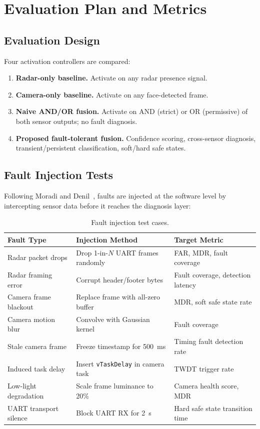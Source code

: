 \documentclass[12pt]{extarticle}
\begin{document}
\section{Evaluation Plan and Metrics}
\label{sec:eval}

\subsection{Evaluation Design}

Four activation controllers are compared:
\begin{enumerate}
  \item \textbf{Radar-only baseline.} Activate on any radar presence signal.
  \item \textbf{Camera-only baseline.} Activate on any face-detected frame.
  \item \textbf{Naive AND/OR fusion.} Activate on AND (strict) or OR (permissive)
        of both sensor outputs; no fault diagnosis.
  \item \textbf{Proposed fault-tolerant fusion.} Confidence scoring, cross-sensor
        diagnosis, transient/persistent classification, soft/hard safe states.
\end{enumerate}

\subsection{Fault Injection Tests}

Following Moradi and Denil~\cite{moradi2020faultinj}, faults are injected at the
software level by intercepting sensor data before it reaches the diagnosis layer:

\begin{table}[H]
\centering
\caption{Fault injection test cases.}
\label{tab:faultinj}
\small
\begin{tabular}{p{3.5cm}p{4.5cm}p{4.5cm}}
\toprule
\textbf{Fault Type} & \textbf{Injection Method} & \textbf{Target Metric}\\
\midrule
Radar packet drops     & Drop 1-in-$N$ UART frames randomly & FAR, MDR, fault coverage\\
Radar framing error    & Corrupt header/footer bytes & Fault coverage, detection latency\\
Camera frame blackout  & Replace frame with all-zero buffer & MDR, soft safe state rate\\
Camera motion blur     & Convolve with Gaussian kernel & Fault coverage\\
Stale camera frame     & Freeze timestamp for 500~ms & Timing fault detection rate\\
Induced task delay     & Insert \texttt{vTaskDelay} in camera task & TWDT trigger rate\\
Low-light degradation  & Scale frame luminance to 20\% & Camera health score, MDR\\
UART transport silence & Block UART RX for 2~s & Hard safe state transition time\\
\bottomrule
\end{tabular}
\end{table}
\end{document}
